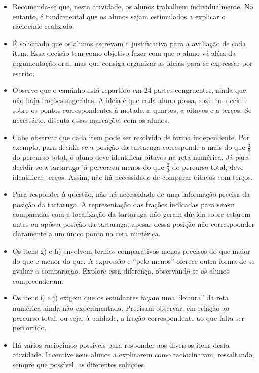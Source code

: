 \begin{multicols}{2}
\begin{itemize} %
    \item       Recomenda-se que, nesta atividade, os alunos trabalhem individualmente. No entanto, é fundamental que os alunos sejam estimulados a explicar o raciocínio realizado.
    \item       É solicitado que os alunos escrevam a justificativa para a avaliação de cada item. Essa decisão tem como objetivo fazer com que o aluno vá além da argumentação oral, mas que consiga organizar as ideias para se expressar por escrito. 
    \item       Observe que o caminho está repartido em 24 partes congruentes, ainda que não haja frações sugeridas. A ideia é que cada aluno possa, sozinho, decidir sobre os pontos correspondentes à metade, a quartos, a oitavos e a terços. Se necessário, discuta essas marcações com os alunos. 
    \item       Cabe observar que cada item pode ser resolvido de forma independente. Por exemplo, para decidir se a posição da tartaruga corresponde a mais do que       $\frac{3}{8}$       do percurso total, o aluno deve identificar oitavos na reta numérica. Já para decidir se a tartaruga já percorreu menos do que       $\frac{2}{3}$       do percurso total, deve identificar terços. Assim, não há necessidade de comparar oitavos com terços.
    \item       Para responder à questão, não há necessidade de uma informação precisa da posição da tartaruga. A representação das frações indicadas para serem comparadas com a localização da tartaruga não geram dúvida sobre estarem antes ou após a posição da tartaruga, apesar dessa posição não correspoonder claramente a um único ponto na reta numérica.   
    \item       Os itens g) e h) envolvem termos comparativos menos precisos do que maior do que e menor do que. A expressão e       ``pelo menos''       oferece outra forma de se avaliar a comparação. Explore essa diferença, observando se os alunos compreenderam.
    \item       Os itens i) e j) exigem que os estudantes façam uma       ``leitura''       da reta numérica ainda não experimentada. Precisam observar, em relação ao percurso total, ou seja, à unidade, a fração correspondente ao que falta ser percorrido. 
    \item       Há vários raciocínios possíveis para responder aos diversos itens desta atividade. Incentive seus alunos a explicarem como raciocinaram, ressaltando, sempre que possível, as diferentes soluções. 
\end{itemize} %
  


\end{multicols}
